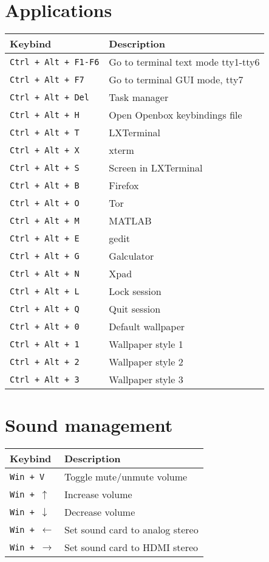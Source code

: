\documentclass[letterpaper,12pt]{article}
\begin{document}
\section*{Applications}
\begin{table}[H]
  \begin{tabular}{|C{5cm}|L{10cm}|}
    \hline
    \textbf{Keybind} & \textbf{Description} \\
    \hline
    {\tt Ctrl + Alt + F1-F6} & Go to terminal text mode tty1-tty6 \\
    {\tt Ctrl + Alt + F7} & Go to terminal GUI mode, tty7 \\
    {\tt Ctrl + Alt + Del} & Task manager \\
    {\tt Ctrl + Alt + H} & Open Openbox keybindings file\\
    {\tt Ctrl + Alt + T} & LXTerminal \\
    {\tt Ctrl + Alt + X} & xterm \\
    {\tt Ctrl + Alt + S} & Screen in LXTerminal \\
    {\tt Ctrl + Alt + B} & Firefox \\
    {\tt Ctrl + Alt + O} & Tor \\
    {\tt Ctrl + Alt + M} & MATLAB \\
    {\tt Ctrl + Alt + E} & gedit \\
    {\tt Ctrl + Alt + G} & Galculator \\
    {\tt Ctrl + Alt + N} & Xpad \\
    {\tt Ctrl + Alt + L} & Lock session \\
    {\tt Ctrl + Alt + Q} & Quit session \\
    {\tt Ctrl + Alt + 0} & Default wallpaper \\
    {\tt Ctrl + Alt + 1} & Wallpaper style 1 \\
    {\tt Ctrl + Alt + 2} & Wallpaper style 2 \\
    {\tt Ctrl + Alt + 3} & Wallpaper style 3 \\
    \hline
  \end{tabular}
\end{table}

\section*{Sound management}
\begin{table}[H]
  \begin{tabular}{|C{5cm}|L{10cm}|}
    \hline
    \textbf{Keybind} & \textbf{Description} \\
    \hline
    {\tt Win + V} & Toggle mute/unmute volume \\
    {\tt Win + $\uparrow$} & Increase volume \\
    {\tt Win + $\downarrow$} & Decrease volume \\
    {\tt Win + $\leftarrow$} & Set sound card to analog stereo \\
    {\tt Win + $\rightarrow$} & Set sound card to HDMI stereo \\
    \hline
  \end{tabular}
\end{table}
\end{document}

